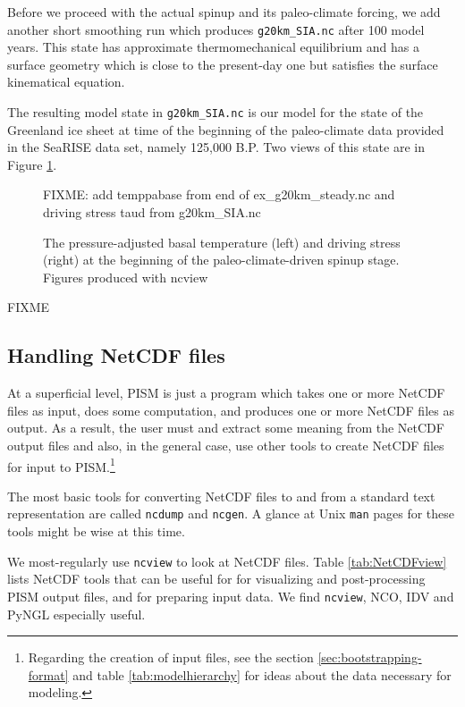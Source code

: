 Before we proceed with the actual spinup and its paleo-climate forcing, we add another short smoothing run which produces \verb|g20km_SIA.nc| after 100 model years.  This state has approximate thermomechanical equilibrium and has a surface geometry which is close to the present-day one but satisfies the surface kinematical equation.

The resulting model state in \verb|g20km_SIA.nc| is our model for the state of the Greenland ice sheet at time of the beginning of the paleo-climate data provided in the SeaRISE data set, namely 125,000 B.P.  Two views of this state are in Figure \ref{fig:sr-spinstart}.

\begin{figure}[ht]
\centering
FIXME: add temppabase from end of ex_g20km_steady.nc and driving stress taud from g20km_SIA.nc
\caption{The pressure-adjusted basal temperature (left) and driving stress (right) at the beginning of the paleo-climate-driven spinup stage.  Figures produced with ncview}
\label{fig:sr-spinstart}
\end{figure}



FIXME





\subsection{Handling NetCDF files}\label{subsect:nctoolsintro}  At a superficial level, PISM is just a program which takes one or more NetCDF files as input, does some computation, and produces one or more NetCDF files as output.  As a result, the user must and extract some meaning from the NetCDF output files and also, in the general case, use other tools to create NetCDF files for input to PISM.\footnote{Regarding the creation of input files, see the section \ref{sec:bootstrapping-format} and table \ref{tab:modelhierarchy} for ideas about the data necessary for modeling.}

The most basic tools for converting NetCDF files to and from a standard text representation are called \verb|ncdump| and \verb|ncgen|.  A glance at Unix \verb|man| pages for these tools might be wise at this time.

We most-regularly use \verb|ncview| to look at NetCDF files.  Table \ref{tab:NetCDFview} lists NetCDF tools that can be useful for for visualizing and post-processing PISM output files, and for preparing input data.  We find \texttt{ncview}, NCO, IDV and PyNGL especially useful.

